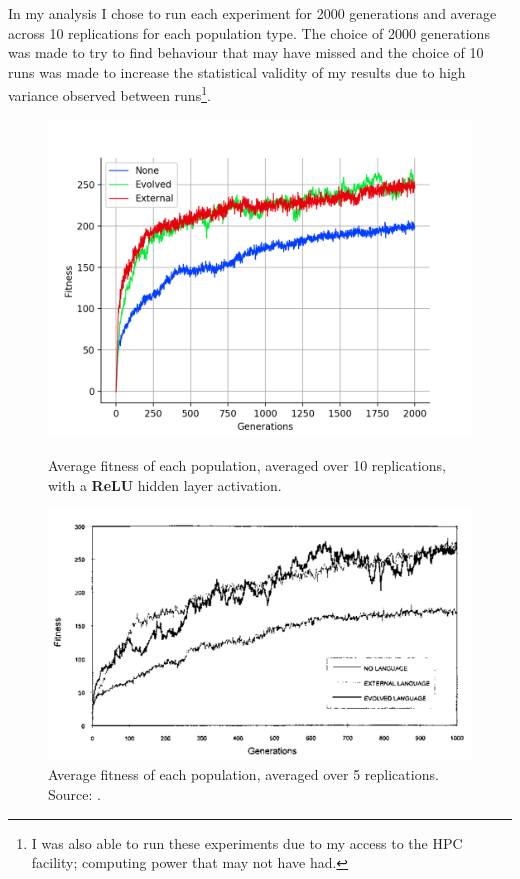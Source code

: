 \documentclass[12pt,a4paper,twoside,openright]{report}
\begin{document}
In my analysis I chose to run each experiment for 2000 generations and average across 10 replications for each population type. The choice of 2000 generations was made to try to find behaviour that \citet{Cangelosi1998} may have missed and the choice of 10 runs was made to increase the statistical validity of my results due to high variance observed between runs\footnote{I was also able to run these experiments due to my access to the HPC facility; computing power that \citet{Cangelosi1998} may not have had.}. 

\begin{figure}[t]
   \centering
   \begin{minipage}{0.49\textwidth}
          \centering
          \captionsetup{width=.9\linewidth}
          \includegraphics[width=1.\linewidth]{results/average-relu.png}
          \caption{Average fitness of each population, averaged over 10 replications, with a {\bf ReLU} hidden layer activation.}
          \label{fig:average-relu}
   \end{minipage}
   \begin{minipage}{0.49\textwidth}
          \centering
          \captionsetup{width=.9\linewidth}
          \includegraphics[width=1.\linewidth]{figs/fitness.png}
          \caption{Average fitness of each population, averaged over 5 replications. Source: \citet{Cangelosi1998}.}
          \label{fig:cangelosi-results}
   \end{minipage}
\end{figure}
\end{document}
